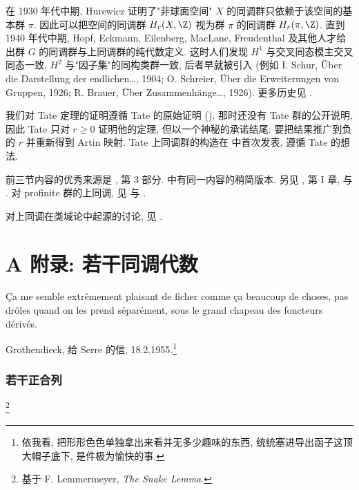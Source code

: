 \begin{NOTES}
在 1930 年代中期, Hurewicz 证明了"非球面空间" $X$ 的同调群只依赖于该空间的基本群 $\pi$. 因此可以把空间的同调群 $H_r(X,\Z)$ 视为群 $\pi$ 的同调群 $H_r(\pi,\Z)$. 直到 1940 年代中期, Hopf, Eckmann, Eilenberg, MacLane, Freudenthal 及其他人才给出群 $G$ 的同调群与上同调群的纯代数定义. 这时人们发现 $H^1$ 与交叉同态模主交叉同态一致, $H^2$ 与"因子集"的同构类群一致, 后者早就被引入 (例如 I. Schur, Über die Darstellung der endlichen…, 1904; O. Schreier, Über die Erweiterungen von Gruppen, 1926; R. Brauer, Über Zusammenhänge…, 1926). 更多历史见 \cite{MacLane1978}.

我们对 Tate 定理的证明遵循 Tate 的原始证明 (\cite{Tate1952}). 那时还没有 Tate 群的公开说明, 因此 Tate 只对 $r\ge 0$ 证明他的定理, 但以一个神秘的承诺结尾: 要把结果推广到负的 $r$ 并重新得到 Artin 映射. Tate 上同调群的构造在 \cite{CartanEilenberg1956} 中首次发表, 遵循 Tate 的想法.

前三节内容的优秀来源是 \cite{Serre1962}, 第 3 部分. \cite{AtiyahWall1967} 中有同一内容的稍简版本. 另见 \cite{Iyanaga1975}, 第 I 章, 与 \cite{Weiss1969}. 对 profinite 群的上同调, 见 \cite{Serre1964} 与 \cite{Shatz1972}.

对上同调在类域论中起源的讨论, 见 .
\end{NOTES}

\section*{A 附录: 若干同调代数}\label{sec:II.A}

Ça me semble extrêmement plaisant de ficher comme ça beaucoup de choses, pas drôles quand on les prend séparément, sous le grand chapeau des foncteurs dérivés.

Grothendieck, 给 Serre 的信, 18.2.1955.\footnote{依我看, 把形形色色单独拿出来看并无多少趣味的东西, 统统塞进导出函子这顶大帽子底下, 是件极为愉快的事.}

\renewcommand{\thetheorem}{A.\arabic{theorem}}
\setcounter{theorem}{0}

\subsubsection*{若干正合列}\footnote{基于 F. Lemmermeyer, \emph{The Snake Lemma}.}

